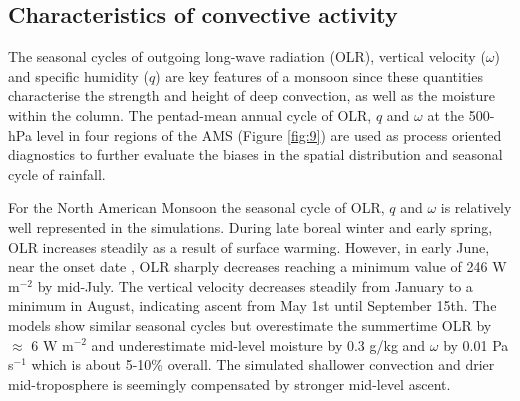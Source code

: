 \subsection{Characteristics of convective activity}

The seasonal cycles of outgoing long-wave radiation (OLR), vertical velocity ($\omega$) and specific humidity ($q$) are key features of a monsoon since these quantities characterise the strength and height of deep convection, as well as the moisture within the column.
 The pentad-mean annual cycle of OLR, $q$ and $\omega$ at the 500-hPa level in four regions of the AMS (Figure \ref{fig:9}) are used as process oriented diagnostics to further evaluate the biases in the spatial distribution and seasonal cycle of rainfall.
 

For the North American Monsoon the seasonal cycle of OLR, $q$ and $\omega$ is relatively well represented in the simulations.
During late boreal winter and early spring, OLR increases steadily as a result of surface warming.
However, in early June, near the onset date \citep{douglas1993,geil2013}, OLR sharply decreases reaching a minimum value of 246 W m$^{-2}$ by mid-July.
The vertical velocity decreases steadily from January to a minimum in August, indicating ascent from May 1st until September 15th.
 The models show similar seasonal cycles but overestimate the summertime OLR by $\approx$ 6 W m$^{-2}$ and underestimate mid-level moisture by 0.3 g/kg and $\omega$ by 0.01 Pa s$^{-1}$ which is about 5-10\% overall. 
The simulated shallower convection and drier mid-troposphere is seemingly compensated by stronger mid-level ascent.


